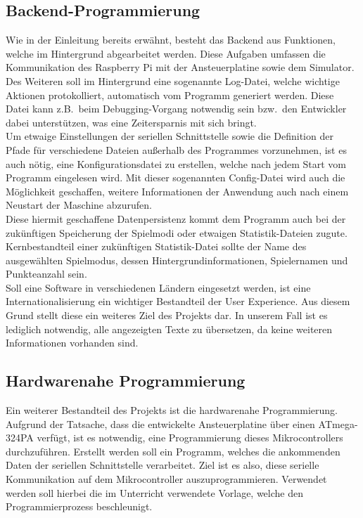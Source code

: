 \subsection{Backend-Programmierung}\label{subsec:backend-programmierung}
Wie in der Einleitung bereits erwähnt, besteht das Backend aus Funktionen, welche im Hintergrund abgearbeitet werden.
Diese Aufgaben umfassen die Kommunikation des Raspberry Pi mit der Ansteuerplatine sowie dem Simulator.\\
Des Weiteren soll im Hintergrund eine sogenannte Log-Datei, welche wichtige Aktionen protokolliert, automatisch vom Programm generiert werden.
Diese Datei kann z.B.\ beim Debugging-Vorgang notwendig sein bzw.\ den Entwickler dabei unterstützen, was eine Zeitersparnis mit sich bringt.\\
Um etwaige Einstellungen der seriellen Schnittstelle sowie die Definition der Pfade für verschiedene Dateien außerhalb des Programmes vorzunehmen, ist es auch nötig, eine Konfigurationsdatei zu erstellen, welche nach jedem Start vom Programm eingelesen wird.
Mit dieser sogenannten \acs{Config}-Datei wird auch die Möglichkeit geschaffen, weitere Informationen der Anwendung auch nach einem Neustart der Maschine abzurufen.\\
Diese hiermit geschaffene Datenpersistenz kommt dem Programm auch bei der zukünftigen Speicherung der Spielmodi oder etwaigen Statistik-Dateien zugute.
Kernbestandteil einer zukünftigen Statistik-Datei sollte der Name des ausgewählten Spielmodus, dessen Hintergrundinformationen, Spielernamen und Punkteanzahl sein.\\
Soll eine Software in verschiedenen Ländern eingesetzt werden, ist eine Internationalisierung ein wichtiger Bestandteil der User Experience.
Aus diesem Grund stellt diese ein weiteres Ziel des Projekts dar.
In unserem Fall ist es lediglich notwendig, alle angezeigten Texte zu übersetzen, da keine weiteren Informationen vorhanden sind.

\subsection{Hardwarenahe Programmierung}\label{subsec:hardwarenahe-programmierung}
Ein weiterer Bestandteil des Projekts ist die hardwarenahe Programmierung.
Aufgrund der Tatsache, dass die entwickelte Ansteuerplatine über einen ATmega-324PA verfügt, ist es notwendig, eine Programmierung dieses Mikrocontrollers durchzuführen.
Erstellt werden soll ein Programm, welches die ankommenden Daten der seriellen Schnittstelle verarbeitet.
Ziel ist es also, diese serielle Kommunikation auf dem Mikrocontroller auszuprogrammieren.
Verwendet werden soll hierbei die im Unterricht verwendete Vorlage, welche den Programmierprozess beschleunigt.
\newpage
